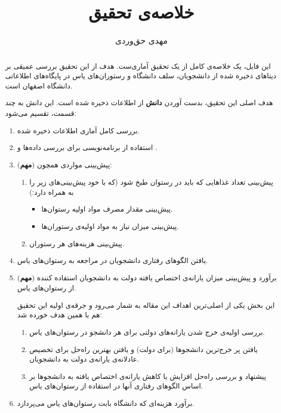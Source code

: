 \documentclass{article}
\title{خلاصه‌ی تحقیق}
\author{مهدی حق‌وردی}
\begin{document}
\newcommand{\important}{{\tiny (\textbf{مهم}) }}
\maketitle

\tableofcontents
\newpage

	\begin{abstract}
	این فایل،‌ یک خلاصه‌ی کامل از یک تحقیق آماری‌ست. هدف از این تحقیق بررسی عمیقی بر دیتا‌های ذخیره‌ شده‌ از دانشجویان، سلف دانشگاه و رستوران‌های یاس در پایگاه‌‌های اطلاعاتی دانشگاه اصفهان است.
	
	هدف اصلی این تحقیق،‌ بدست آوردن \textbf{دانش} از اطلاعات ذخیره‌ شده است. این دانش به چند قسمت، تقسیم می‌شود:
	\begin{enumerate}
		\item 
		بررسی کامل آماری اطلاعات ذخیره شده.
		\item
		 استفاده از برنامه‌نویسی برای بررسی داده‌ها و .
		\item \important
		 پیش‌بینی مواردی همچون:
		\begin{enumerate}
			\item
			پیش‌بینی تعداد‌ غذا‌هایی که باید در رستوان طبخ شود (که با خود پیش‌بینی‌های زیر را به همراه دارد:)
			\begin{itemize}
			    \item 
			    پیش‌بینی مقدار مصرف مواد اولیه‌ رستوان‌ها.
			    \item 
			    پیش‌بینی میزان نیاز به مواد اولیه‌ی رستوران‌‌ها.
			\end{itemize}
		    \item 
		    پیش‌بینی هزینه‌های هر رستوران.
		\end{enumerate}
	    \item 
	    یافتن الگو‌های رفتاری دانشجویان در مراجعه به رستوان‌‌های یاس.
		\item \important
			برآورد و پیش‌بینی میزان یارانه‌ی اختصاص یافته‌ دولت به دانشجویان استفاده کننده از رستوان‌های یاس.
			
			این بخش یکی از اصلی‌ترین اهداف این مقاله به شمار می‌رود و جرقه‌ی اولیه این تحقیق هم با همین هدف خورده‌ شد:
		\begin{enumerate}
			\item 
			بررسی اولیه‌ی خرج‌ شدن یارانه‌های دولتی برای هر دانشجو در رستوان‌های یاس.
			\item 
			یافتن پر خرج‌ترین دانشجو‌ها (برای دولت) و یافتن بهترین راه‌حل برای تخصیص  عادلانه‌ی یارانه‌ی دولت به دانشجویان.
			\item 
			پیشنهاد و بررسی راه‌حل افزایش یا کاهش یارانه‌ی اختصاص یافته به دانشجو‌ها بر اساس الگو‌های رفتاری آنها در استفاده از رستوان‌های یاس.
		\end{enumerate}
	    \item 
	    برآورد هزینه‌ای که دانشگاه بابت رستوان‌های یاس می‌پردازد.
	\end{enumerate}
	\end{abstract}
	\newpage
\end{document}
